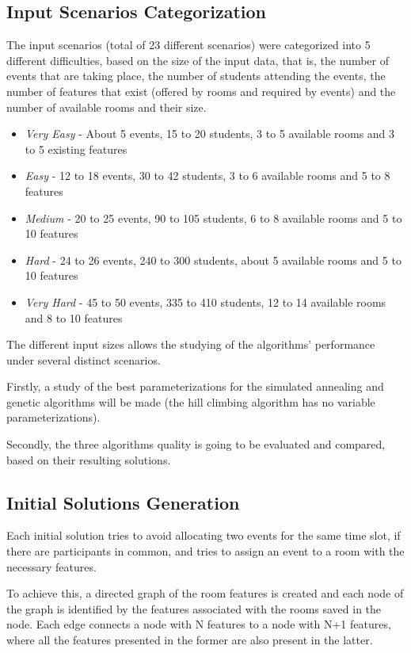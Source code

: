 \documentclass[conference]{IEEEtran}
\begin{document}
\subsection{Input Scenarios Categorization}

The input scenarios (total of 23 different scenarios) were categorized into 5 different difficulties, based on the size of the input data, that is, the number of events that are taking place, the number of students attending the events, the number of features that exist (offered by rooms and required by events) and the number of available rooms and their size.

\begin{itemize}
    \item \textit{Very Easy} - About 5 events, 15 to 20 students, 3 to 5 available rooms and 3 to 5 existing features 
    \item \textit{Easy} - 12 to 18 events, 30 to 42 students, 3 to 6 available rooms and 5 to 8 features 
    \item \textit{Medium} - 20 to 25 events, 90 to 105 students, 6 to 8 available rooms and 5 to 10 features
    \item \textit{Hard} - 24 to 26 events, 240 to 300 students, about 5 available rooms and 5 to 10 features
    \item \textit{Very Hard} - 45 to 50 events, 335 to 410 students, 12 to 14 available rooms and 8 to 10 features
\end{itemize}

The different input sizes allows the studying of the algorithms' performance under several distinct scenarios.

Firstly, a study of the best parameterizations for the simulated annealing and genetic algorithms will be made (the hill climbing algorithm has no variable parameterizations).

Secondly, the three algorithms quality is going to be evaluated and compared, based on their resulting solutions.

\subsection{Initial Solutions Generation} \label{subsec:isg}

Each initial solution tries to avoid allocating two events for the same time slot, if there are participants in common, and tries to assign an event to a room with the necessary features.

To achieve this, a directed graph of the room features is created and each node of the graph is identified by the features associated with the rooms saved in the node. Each edge connects a node with N features to a node with N+1 features, where all the features presented in the former are also present in the latter.
\end{document}
